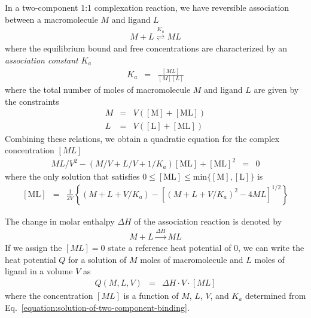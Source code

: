 \documentclass[aps,pre,twocolumn,nofootinbib,superscriptaddress,linenumbers]{revtex4-1}
\newcommand{\conc}[1] {\left[ \mathrm{#1} \right]}
\begin{document}
\begin{widetext}
In a two-component 1:1 complexation reaction, we have reversible association between a macromolecule $M$ and ligand $L$
\begin{eqnarray}
M + L \overset{K_a}{\rightleftharpoons} ML
\end{eqnarray}
where the equilibrium bound and free concentrations are characterized by an \emph{association constant} $K_a$
\begin{eqnarray}
K_a &=& \frac{[ML]}{[M][L]}
\end{eqnarray}
where the total number of moles of macromolecule $M$ and ligand $L$ are given by the constraints
\begin{eqnarray}
M &=& V(\conc{M} + \conc{ML}) \nonumber \\
L &=& V(\conc{L} + \conc{ML})
\end{eqnarray}
Combining these relations, we obtain a quadratic equation for the complex concentration $[ML]$
\begin{eqnarray}
M L / V^2 - (M/V + L/V + 1/K_a) \conc{ML} + \conc{ML}^2 &=& 0
\end{eqnarray}
where the only solution that satisfies $0 \le \conc{ML} \le \mathrm{min}\{\conc{M},\conc{L}\}$ is
\begin{eqnarray}
\conc{ML} &=& \frac{1}{2 V} \left\{ (M + L + V/K_a) - \left[ (M + L + V/K_a)^2 - 4 M L \right]^{1/2} \right\} \label{equation:solution-of-two-component-binding}
\end{eqnarray}

The change in molar enthalpy $\Delta H$ of the association reaction is denoted by
\begin{eqnarray}
M + L \overset{\Delta H}{\rightarrow} ML
\end{eqnarray}
If we assign the $[ML] = 0$ state a reference heat potential of $0$, we can write the heat potential $Q$ for a solution of $M$ moles of macromolecule and $L$ moles of ligand in a volume $V$ as
\begin{eqnarray}
Q(M,L,V) &=& \Delta H \cdot V \cdot [ML]
\end{eqnarray}
where the concentration $[ML]$ is a function of $M$, $L$, $V$, and $K_a$ determined from Eq.~\ref{equation:solution-of-two-component-binding}.


\end{widetext}
\end{document}
